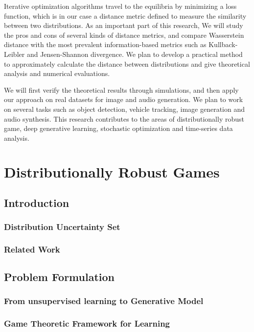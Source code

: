 \documentclass{article}
\begin{document}
Iterative optimization algorithms travel to the equilibria by minimizing a loss function, which is in our case a distance metric defined to measure the similarity between two distributions. As an important part of this research, We will study the pros and cons of several kinds of distance metrics, and compare Wasserstein distance with the most prevalent information-based metrics such as Kullback-Leibler and Jensen-Shannon divergence. We plan to develop a practical method to approximately calculate the distance between distributions and give theoretical analysis and numerical evaluations.

We will first verify the theoretical results through simulations, and then apply our approach on real datasets for image and audio generation. We plan to work on several tasks such as object detection, vehicle tracking, image generation and audio synthesis. This research contributes to the areas of distributionally robust game, deep generative learning, stochastic optimization and time-series data analysis.


\section{Distributionally Robust Games}
\label{Sec:DRG}

\subsection{Introduction}

\subsubsection{Distribution Uncertainty Set}

\subsubsection{Related Work}


\subsection{Problem Formulation}

\subsubsection{From unsupervised learning to Generative Model}

\subsubsection{Game Theoretic Framework for Learning}
\end{document}
